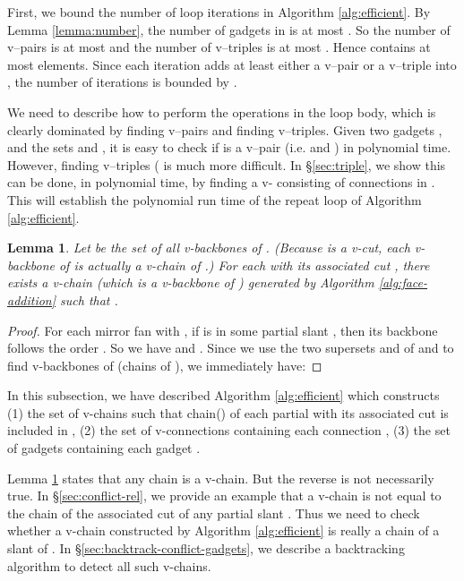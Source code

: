 \documentclass[11pt]{article}
\newtheorem{lemma}[figure]{Lemma}
\begin{document}
First, we bound the number of loop iterations in Algorithm \ref{alg:efficient}.
By Lemma \ref{lemma:number}, the number of gadgets in  is at most
. So the number of v--pairs is at most  and the
number of v--triples is at most . Hence  contains
at most  elements. Since each iteration adds at least either
a v--pair or a v--triple into , the number of
iterations is bounded by .

We need to describe how to perform the operations in the loop body,
which is clearly dominated by finding v--pairs and
finding v--triples. Given two gadgets ,  and the sets
 and , it is easy to check if 
is a v--pair (i.e.  and )
in polynomial time. However,
finding v--triples ( is
much more difficult. In \S \ref{sec:triple}, we show this can be done,
in polynomial time, by finding a v- consisting of
connections in . This will establish the polynomial run time of
the repeat loop of Algorithm \ref{alg:efficient}.
\begin{lemma}\label{lemma:sufficient}
Let  be the set of all v-backbones of .
(Because  is a v-cut,
each v-backbone of  is actually a v-chain of .)
For each  with its associated cut ,
there exists a v-chain  (which is a v-backbone
of ) generated by Algorithm \ref{alg:face-addition}
such that .
\end{lemma}

\begin{proof}
For each mirror fan  with ,
if  is in some partial slant ,
then its backbone follows the order .
So we have  and
.
Since we use the two supersets  and 
of  and  to find v-backbones of  (chains of ),
we immediately have:


\end{proof}


In this subsection, we have described Algorithm \ref{alg:efficient}
which constructs
(1) the set  of v-chains such that
chain() of each partial   with its
associated cut  is included in ,
(2) the set  of v-connections containing
each connection ,
(3) the set  of gadgets containing
each gadget .

Lemma \ref{lemma:sufficient} states that any chain is a v-chain.
But the reverse is not necessarily true.
In \S \ref{sec:conflict-rel}, we provide
an example that a v-chain
is not equal to the chain of
the associated cut of any partial slant .
Thus we need to check whether a v-chain constructed by
Algorithm \ref{alg:efficient} is really
a chain of a slant   of .
In \S \ref{sec:backtrack-conflict-gadgets},
we describe a backtracking algorithm to detect all such v-chains.
\end{document}
